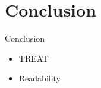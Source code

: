 \section{Conclusion}
\begin{frame}{Conclusion}
    \begin{itemize}
        \item TREAT
        \item Readability
    \end{itemize}
\end{frame}